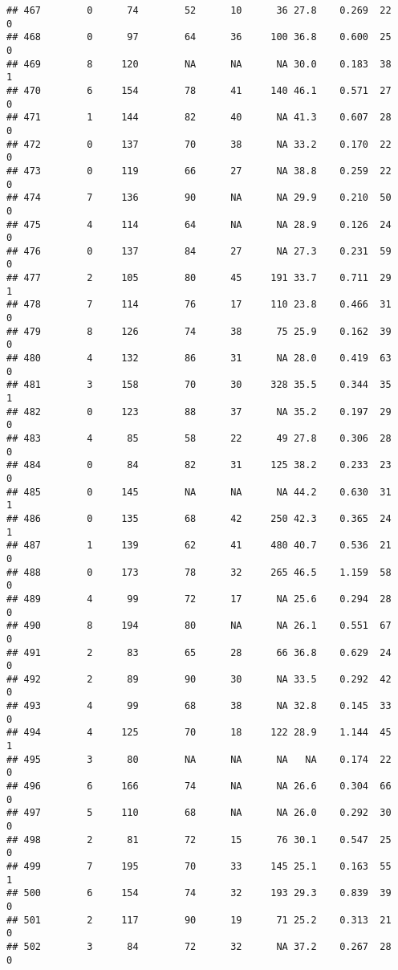 \documentclass[
]{article}
\begin{document}
\begin{verbatim}
## 467        0      74        52      10      36 27.8    0.269  22    0
## 468        0      97        64      36     100 36.8    0.600  25    0
## 469        8     120        NA      NA      NA 30.0    0.183  38    1
## 470        6     154        78      41     140 46.1    0.571  27    0
## 471        1     144        82      40      NA 41.3    0.607  28    0
## 472        0     137        70      38      NA 33.2    0.170  22    0
## 473        0     119        66      27      NA 38.8    0.259  22    0
## 474        7     136        90      NA      NA 29.9    0.210  50    0
## 475        4     114        64      NA      NA 28.9    0.126  24    0
## 476        0     137        84      27      NA 27.3    0.231  59    0
## 477        2     105        80      45     191 33.7    0.711  29    1
## 478        7     114        76      17     110 23.8    0.466  31    0
## 479        8     126        74      38      75 25.9    0.162  39    0
## 480        4     132        86      31      NA 28.0    0.419  63    0
## 481        3     158        70      30     328 35.5    0.344  35    1
## 482        0     123        88      37      NA 35.2    0.197  29    0
## 483        4      85        58      22      49 27.8    0.306  28    0
## 484        0      84        82      31     125 38.2    0.233  23    0
## 485        0     145        NA      NA      NA 44.2    0.630  31    1
## 486        0     135        68      42     250 42.3    0.365  24    1
## 487        1     139        62      41     480 40.7    0.536  21    0
## 488        0     173        78      32     265 46.5    1.159  58    0
## 489        4      99        72      17      NA 25.6    0.294  28    0
## 490        8     194        80      NA      NA 26.1    0.551  67    0
## 491        2      83        65      28      66 36.8    0.629  24    0
## 492        2      89        90      30      NA 33.5    0.292  42    0
## 493        4      99        68      38      NA 32.8    0.145  33    0
## 494        4     125        70      18     122 28.9    1.144  45    1
## 495        3      80        NA      NA      NA   NA    0.174  22    0
## 496        6     166        74      NA      NA 26.6    0.304  66    0
## 497        5     110        68      NA      NA 26.0    0.292  30    0
## 498        2      81        72      15      76 30.1    0.547  25    0
## 499        7     195        70      33     145 25.1    0.163  55    1
## 500        6     154        74      32     193 29.3    0.839  39    0
## 501        2     117        90      19      71 25.2    0.313  21    0
## 502        3      84        72      32      NA 37.2    0.267  28    0

\end{verbatim}
\end{document}
